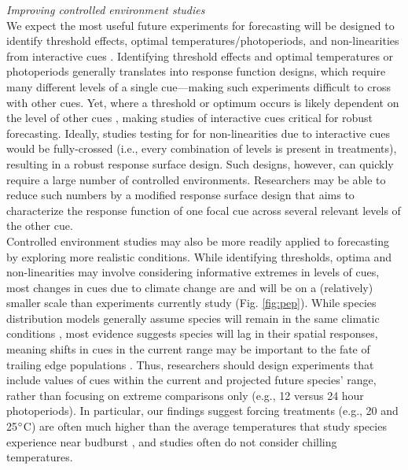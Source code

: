 \documentclass[11pt,letter]{article}
\newcommand{\R}[1]{\label{#1}\linelabel{#1}}
\begin{document}
\emph{Improving controlled environment studies}\\
We expect the most useful future experiments for forecasting will be designed to identify threshold effects, optimal temperatures/photoperiods, and non-linearities from interactive cues \citep{Caffarra:2011qf}. Identifying threshold effects and optimal temperatures or photoperiods generally translates into \R{r2respfx}response function designs, which require many different levels of a single cue---making such experiments difficult to cross with other cues. Yet, where a threshold or optimum occurs is likely dependent on the level of other cues \citep{stearns1958,flynn2018}, making studies of interactive cues critical for robust forecasting. Ideally, studies testing for for non-linearities due to interactive cues would be fully-crossed (i.e., every combination of levels is present in treatments), \R{r2studydesignstart}resulting in a robust response surface design. Such designs, however, can quickly require a large number of controlled environments. Researchers may be able to reduce such numbers by a modified response surface design that aims to characterize the response function of one focal cue across several relevant levels of the other cue.\R{r2studydesignend} \\ %

Controlled environment studies may also be more readily applied to forecasting by exploring more realistic conditions. While identifying thresholds, optima and non-linearities may involve considering informative extremes in levels of cues, most changes in cues due to climate change are and will be on a (relatively) smaller scale than experiments currently study (Fig. \ref{fig:pep}). While species distribution models generally assume species will remain in the same climatic conditions \citep{elith2009species}, most evidence suggests species will lag in their spatial responses, meaning shifts in cues in the current range may be important to the fate of trailing edge populations \citep{bertrand2011changes,lenoir2015climate}. Thus, researchers should design experiments that include values of cues within the current and projected future species' range, rather than focusing on extreme comparisons only (e.g., 12 versus 24 hour photoperiods). In particular, our findings suggest forcing treatments (e.g., 20 and 25$\degree$C) are often much higher than the average temperatures that study species experience near budburst \citep{fu2015,gusewell2017}, and studies often do not consider chilling temperatures. \\ %
\end{document}
